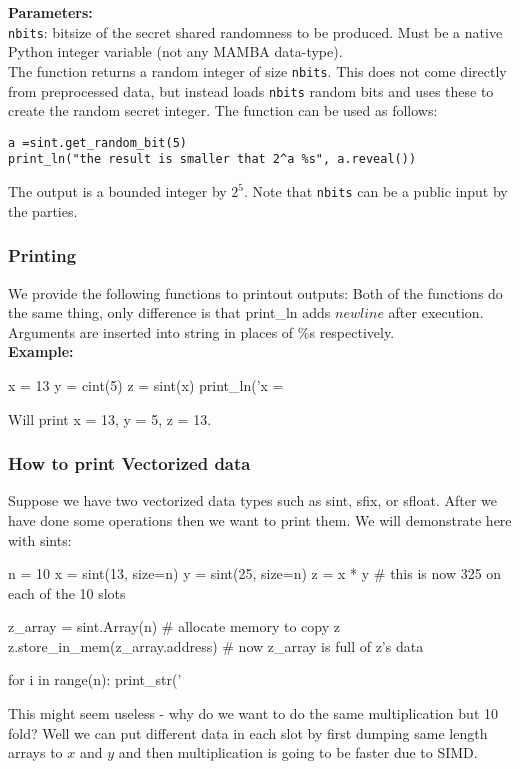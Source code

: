 \textbf{Parameters:}\\
	\verb|nbits|: bitsize of the secret shared randomness to be produced. Must be a native Python integer variable (not any MAMBA data-type).\\
\noindent
The function returns a random integer of size \verb|nbits|. This does not come directly from preprocessed data, but instead loads \verb|nbits| random bits and uses these to create the random secret integer. The function can be used as follows:
\begin{lstlisting}
a =sint.get_random_bit(5)
print_ln("the result is smaller that 2^a %s", a.reveal())
\end{lstlisting}
The output is a bounded integer by $2^5$. Note that \verb|nbits| can be a public input by the parties. 
\subsubsection{Printing}
We provide the following functions to printout outputs:
Both of the functions do the same thing, only difference is that print_ln adds $newline$ after execution. Arguments are inserted into string in places of $\%$s respectively. \\
\textbf{Example:}
\begin{mylisting}
x = 13
y = cint(5)
z = sint(x)
print_ln('x = %
\end{mylisting}
Will print x = 13, y = 5, z = 13.

\subsubsection{How to print Vectorized data}
Suppose we have two vectorized data types such as sint, sfix, or sfloat. After we have done some operations then we want to print them. We will demonstrate here with sints:

\begin{mylisting}
n = 10
x = sint(13, size=n)
y = sint(25, size=n)
z = x * y # this is now 325 on each of the 10 slots

z_array = sint.Array(n) # allocate memory to copy z
z.store_in_mem(z_array.address) # now z_array is full of z's data

for i in range(n):
	print_str('%
\end{mylisting}
This might seem useless - why do we want to do the same multiplication but 10 fold? Well we can put different data in each slot by first dumping same length arrays to $x$ and $y$ and then multiplication is going to be faster due to SIMD.

